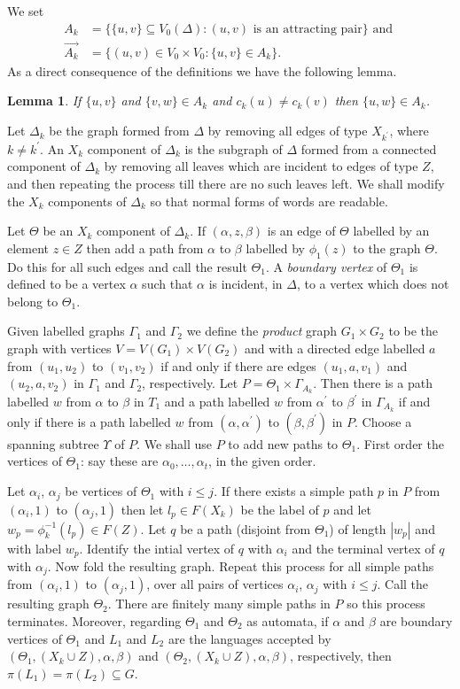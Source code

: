 \documentclass[a4paper,12pt]{article}
\renewcommand{\a}{\alpha }
\renewcommand{\b}{\beta }
\newcommand{\G}{\Gamma }
\newcommand{\D}{\Delta }
\newcommand{\T}{\Theta }
\newcommand{\U}{\Upsilon }
\newtheorem{lemma}[theorem]{Lemma}
\numberwithin{equation}{section}
\numberwithin{figure}{section}
\begin{document}
We set 
\begin{align}
A_k&=\{\{u,v\}\subseteq V_0(\D): (u,v) \textrm{ is an attracting pair}\} \textrm{ and }\\\label{eq:attset}
\vec{A_k}&=\{(u,v)\in V_0\times V_0: \{u,v\}\in A_k\}.
\end{align}
As a direct consequence of the definitions we have the following lemma.
\begin{lemma}
If $\{u,v\}$ and $\{v,w\}\in A_k$ and $c_k(u)\neq c_k(v)$ then 
$\{u,w\}\in A_k$.
\end{lemma}
Let $\D_k$ be the graph formed from $\D$ by removing all edges of type
$X_{k^\prime}$, where $k\neq k^\prime$. An $X_k$ component of $\D_k$ is 
the subgraph of $\D$ formed from a connected component of $\D_k$ by removing
all leaves which are incident to edges of type $Z$, and then repeating the
process till there are no such leaves left. 
 We shall modify the $X_k$ components of $\D_k$ so that normal forms of words 
are readable. 

Let $\T$ be an $X_k$ component of $\D_k$. If $(\a,z,\b)$ is an edge of 
$\T$ labelled by an element $z\in Z$ then add a path from $\a$ to 
$\b$ labelled by $\phi_1(z)$ to the graph $\T$. Do this for all such edges
and call the result $\T_1$.   A 
{\em boundary vertex} of $\T_1$ is defined to be a vertex
$\a$ such that $\a$ is incident, in $\D$, to a vertex which does not
belong to $\T_1$.  

Given labelled 
graphs $\G_1$ and $\G_2$ we define the {\em product} graph $G_1\times G_2$
to be the graph with vertices $V=V(G_1)\times V(G_2)$ and with a directed
edge labelled $a$ from $(u_1,u_2)$ to $(v_1,v_2)$ if and only if there are 
edges $(u_1,a, v_1)$ and $(u_2,a,v_2)$ in $\G_1$ and $\G_2$, respectively. 
Let $P=\T_1\times \G_{A_k}$. Then there is a path labelled $w$ from 
$\a$ to $\b$ in $T_1$ and a path labelled $w$ from $\a^\prime $ to $\b^\prime$
in $\G_{A_k}$ if and only if there is a path labelled $w$ from $(\a,\a^\prime)$ to
$(\b,\b^\prime)$ in $P$. Choose a spanning  subtree $\U$ of  $P$. We shall
use $P$ to add new paths to $\T_1$. First order the vertices of
$\T_1$: say these are $\a_0,\ldots, \a_t$, in the given order.

Let $\a_i$, $\a_j$ be vertices of  $\T_1$ with $i\le j$. If  
there exists a simple path $p$ in $P$ from $(\a_i,1)$ to $(\a_j,1)$ then let 
$l_p\in F(X_k)$ be the label of $p$ and let $w_p=\phi_k^{-1}(l_p)\in F(Z)$. 
Let $q$ be a path (disjoint from $\T_1$) of length $|w_p|$ and with 
label $w_p$. Identify the intial vertex of $q$ with $\a_i$ and the 
terminal vertex of $q$ with $\a_j$. Now fold the resulting graph. Repeat
this process for all simple paths from  $(\a_i,1)$ to $(\a_j,1)$, over
all pairs of vertices $\a_i$, $\a_j$ with $i\le j$. Call the resulting
graph $\T_2$. There are finitely many simple paths in $P$ so this process
terminates. Moreover, regarding $\T_1$ and $\T_2$ as automata, if $\a$ and
 $\b$ are
boundary vertices of $\T_1$ and $L_1$ and $L_2$ are the
languages accepted by $(\T_1,(X_k\cup Z), \a,\b)$ and 
$(\T_2,(X_k\cup Z), \a,\b)$, respectively, then $\pi(L_1)=\pi(L_2)\subseteq G$.
\end{document}
